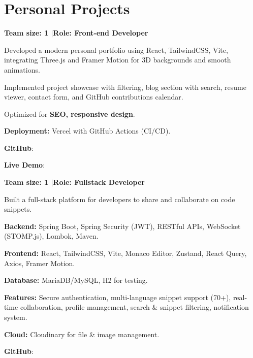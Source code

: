 \section{Personal Projects}


\textbf{Team size: 1 \enspace$\vert$\enspace Role: Front-end Developer}

\begin{entryItems}
    \item Developed a modern personal portfolio using React, TailwindCSS, Vite, integrating Three.js and Framer Motion for 3D backgrounds and smooth animations.
    \item Implemented project showcase with filtering, blog section with search, resume viewer, contact form, and GitHub contributions calendar.
    \item Optimized for \textbf{SEO, responsive design}.
    \item \textbf{Deployment:} Vercel with GitHub Actions (CI/CD).
    \item \textbf{GitHub}: 
    \item \textbf{Live Demo}: 
\end{entryItems}


\textbf{Team size: 1 \enspace$\vert$\enspace Role: Fullstack Developer}

\begin{entryItems}
    \item Built a full-stack platform for developers to share and collaborate on code snippets.
    \item \textbf{Backend:} Spring Boot, Spring Security (JWT), RESTful APIs, WebSocket (STOMP.js), Lombok, Maven.
    \item \textbf{Frontend:} React, TailwindCSS, Vite, Monaco Editor, Zustand, React Query, Axios, Framer Motion.
    \item \textbf{Database:} MariaDB/MySQL, H2 for testing.
    \item \textbf{Features:} Secure authentication, multi-language snippet support (70+), real-time collaboration, profile management, search \& snippet filtering, notification system.
    \item \textbf{Cloud:} Cloudinary for file \& image management.
    \item \textbf{GitHub}: 
\end{entryItems}


